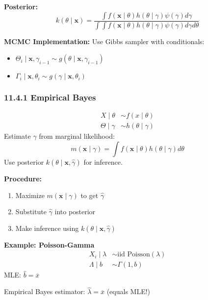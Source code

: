 \textbf{Posterior:}
\[
k(\theta \mid \mathbf{x}) = \frac{\int f(\mathbf{x} \mid \theta) h(\theta \mid \gamma) \psi(\gamma) d\gamma}{\int\int f(\mathbf{x} \mid \theta) h(\theta \mid \gamma) \psi(\gamma) d\gamma d\theta}
\]

\textbf{MCMC Implementation:}
Use Gibbs sampler with conditionals:

\begin{itemize}
	\item $\Theta_i \mid \mathbf{x}, \gamma_{i-1} \sim g(\theta \mid \mathbf{x}, \gamma_{i-1})$
	\item $\Gamma_i \mid \mathbf{x}, \theta_i \sim g(\gamma \mid \mathbf{x}, \theta_i)$
\end{itemize}

\subsubsection{11.4.1 Empirical Bayes}

\begin{definition}
\[
\begin{aligned}
X \mid \theta &\sim f(x \mid \theta) \\
\Theta \mid \gamma &\sim h(\theta \mid \gamma)
\end{aligned}
\]Estimate $\widehat{\gamma}$ from marginal likelihood:
\[
m(\mathbf{x} \mid \gamma) = \int f(\mathbf{x} \mid \theta) h(\theta \mid \gamma) d\theta
\]
Use posterior $k(\theta \mid \mathbf{x}, \widehat{\gamma})$ for inference.
\end{definition}
\textbf{Procedure:}

\begin{enumerate}
	\item Maximize $m(\mathbf{x} \mid \gamma)$ to get $\widehat{\gamma}$
	\item Substitute $\widehat{\gamma}$ into posterior
	\item Make inference using $k(\theta \mid \mathbf{x}, \widehat{\gamma})$
\end{enumerate}

\textbf{Example: Poisson-Gamma}
\[
\begin{aligned}
X_i \mid \lambda &\sim \text{iid Poisson}(\lambda) \\
\Lambda \mid b &\sim \Gamma(1, b)
\end{aligned}
\]
MLE: $\widehat{b} = \overline{x}$

Empirical Bayes estimator: $\widehat{\lambda} = \overline{x}$ (equals MLE!)

